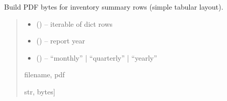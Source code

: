\documentclass[a4paper,11pt,spanish]{sphinxmanual}
\begin{document}

\begin{fulllineitems}
\label{\detokenize{api/reports/reports.services:reports.services.build_inventory_pdf}}
\pysigstartsignatures
\pysiglinewithargsret
{}
{\sphinxparamcomma {}\sphinxparamcomma {}}
{}
\pysigstopsignatures
\sphinxAtStartPar
Build PDF bytes for inventory summary rows (simple tabular layout).
\begin{quote}\begin{description}
\begin{itemize}
\item {} 
\sphinxAtStartPar
{} (\sphinxstyleliteralemphasis{\sphinxupquote{{[}}}\sphinxstyleliteralemphasis{\sphinxupquote{{[}}}\sphinxstyleliteralemphasis{\sphinxupquote{, }}\sphinxstyleliteralemphasis{\sphinxupquote{{]}}}\sphinxstyleliteralemphasis{\sphinxupquote{{]}}}) – iterable of dict rows

\item {} 
\sphinxAtStartPar
{} () – report year

\item {} 
\sphinxAtStartPar
{} () – “monthly” | “quarterly” | “yearly”

\end{itemize}

\sphinxAtStartPar
filename, pdf

\sphinxAtStartPar
\sphinxstyleemphasis{Tuple}{[}str, bytes{]}

\end{description}\end{quote}

\end{fulllineitems}
\end{document}
